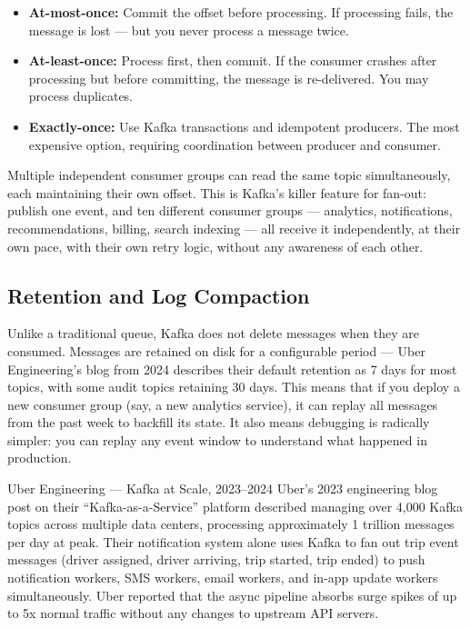 \documentclass[11pt,a4paper]{article}
\begin{document}
\begin{itemize}[leftmargin=1.5em, itemsep=3pt]
  \item \textbf{At-most-once:} Commit the offset before processing. If processing fails, the message is lost --- but you never process a message twice.
  \item \textbf{At-least-once:} Process first, then commit. If the consumer crashes after processing but before committing, the message is re-delivered. You may process duplicates.
  \item \textbf{Exactly-once:} Use Kafka transactions and idempotent producers. The most expensive option, requiring coordination between producer and consumer.
\end{itemize}

Multiple independent consumer groups can read the same topic simultaneously, each maintaining their own offset. This is Kafka's killer feature for fan-out: publish one event, and ten different consumer groups --- analytics, notifications, recommendations, billing, search indexing --- all receive it independently, at their own pace, with their own retry logic, without any awareness of each other.

\subsection{Retention and Log Compaction}

Unlike a traditional queue, Kafka does not delete messages when they are consumed. Messages are retained on disk for a configurable period --- Uber Engineering's blog from 2024 describes their default retention as 7 days for most topics, with some audit topics retaining 30 days. This means that if you deploy a new consumer group (say, a new analytics service), it can replay all messages from the past week to backfill its state. It also means debugging is radically simpler: you can replay any event window to understand what happened in production.

\begin{industrybox}{Uber Engineering --- Kafka at Scale, 2023--2024}
Uber's 2023 engineering blog post on their ``Kafka-as-a-Service'' platform described managing over 4,000 Kafka topics across multiple data centers, processing approximately 1 trillion messages per day at peak. Their notification system alone uses Kafka to fan out trip event messages (driver assigned, driver arriving, trip started, trip ended) to push notification workers, SMS workers, email workers, and in-app update workers simultaneously. Uber reported that the async pipeline absorbs surge spikes of up to 5x normal traffic without any changes to upstream API servers.
\end{industrybox}
\end{document}
